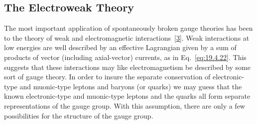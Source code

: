 \subsection{The Electroweak Theory}
\label{sec:21.3}

The most important application of spontaneously broken gauge theories has been to the theory of weak and electromagnetic interactions~\hyperref[ch21-ref-3]{[3]}. Weak interactions at low energies are well described by an effective Lagrangian given by a sum of products of vector (including axial-vector) currents, as in Eq.~\eqref{eq:19.4.22}. This suggests that these interactions may like electromagnetism be described by some sort of gauge theory. In order to insure the separate conservation of electronic-type and muonic-type leptons and baryons (or quarks) we may guess that the known electronic-type and muonic-type leptons and the quarks all form separate representations of the gauge group. With this assumption, there are only a few possibilities for the structure of the gauge group.

